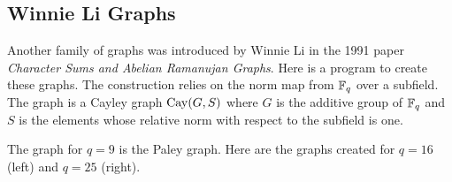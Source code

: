 \subsection{Winnie Li Graphs}


Another family of graphs was introduced by Winnie Li in the 1991 paper 
{\em Character Sums and Abelian Ramanujan Graphs}. 
Here is a program to create these graphs. 
The construction relies on the norm map from ${\mathbb F}_q$ over a subfield.
The graph is a Cayley graph ${\rm Cay}(G,S)$ where $G$ is the additive group of ${\mathbb F}_q$ 
and $S$ is the elements whose relative norm with respect to the subfield is one.


{\small
{\tt

}
}



%

The graph for $q=9$ is the Paley graph.
Here are the graphs created for $q=16$ (left) and $q=25$ (right).
$$

\quad

$$


